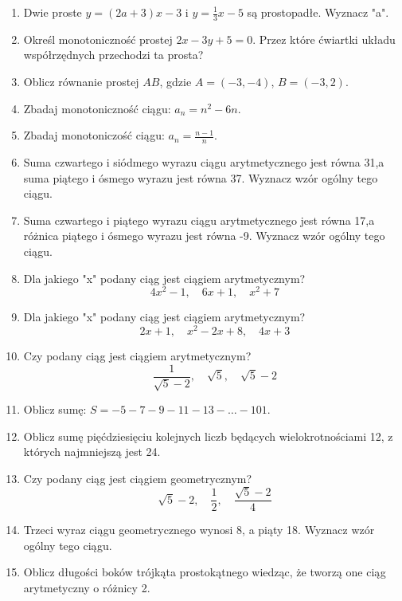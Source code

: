 \documentclass[12pt,a4paper]{article}
\begin{document}
\begin{enumerate}[1.]
		\item Dwie proste $y=(2a+3)x-3$ i $y=\frac{1}{3}x-5$ są prostopadłe. Wyznacz "a".
		
		\item Określ monotoniczność prostej $2x-3y+5=0$. Przez które ćwiartki układu współrzędnych przechodzi ta prosta?
		
		\item Oblicz równanie prostej $AB$, gdzie $A=(-3,-4)$, $B=(-3,2)$.
		
		\item Zbadaj monotoniczność ciągu: $a_n=n^2-6n$.
		
		\item Zbadaj monotoniczość ciągu: $a_n=\frac{n-1}{n}$.
		
		\item Suma czwartego i siódmego wyrazu ciągu arytmetycznego jest równa 31,a suma piątego i ósmego wyrazu jest równa 37. Wyznacz wzór ogólny tego ciągu.
		
		\item Suma czwartego i piątego wyrazu ciągu arytmetycznego jest równa 17,a różnica piątego i ósmego wyrazu jest równa -9. Wyznacz wzór ogólny tego ciągu.
		
		\item Dla jakiego "x" podany ciąg jest ciągiem arytmetycznym?
		$$4x^2 - 1,\quad 6x + 1,\quad x^2 + 7$$
		
		\item Dla jakiego "x" podany ciąg jest ciągiem arytmetycznym?
		$$2x+ 1,\quad x^2 - 2x + 8,\quad 4x + 3$$
		
		\item Czy podany ciąg jest ciągiem arytmetycznym?
		$$\frac{1}{\sqrt{5}-2},\quad \sqrt{5},\quad \sqrt{5}-2$$
		
		\item Oblicz sumę: $S=-5-7-9-11-13-\dots - 101$.
		
		\item Oblicz sumę pięćdziesięciu kolejnych liczb będących wielokrotnościami 12, z których
		najmniejszą jest 24.
		
		\item Czy podany ciąg jest ciągiem geometrycznym?
		$$\sqrt{5}-2,\quad \frac{1}{2},\quad \frac{\sqrt{5}-2}{4}$$
		
		\item Trzeci wyraz ciągu geometrycznego wynosi 8, a piąty 18. Wyznacz wzór ogólny tego ciągu.
		
		\item Oblicz długości boków trójkąta prostokątnego wiedząc, że tworzą one ciąg arytmetyczny
		o różnicy 2.
		

\end{enumerate}
\end{document}
